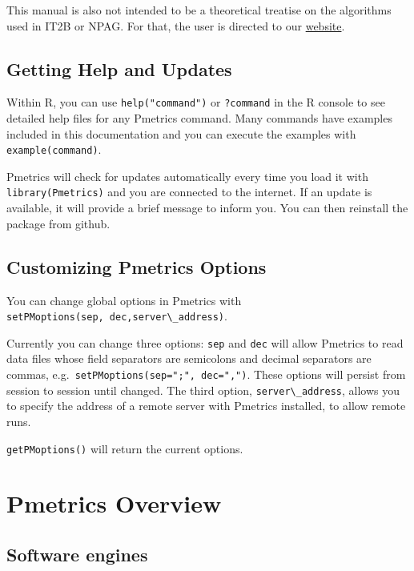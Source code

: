 \documentclass[
]{book}
\begin{document}
This manual is also not intended to be a theoretical treatise on the
algorithms used in IT2B or NPAG. For that, the user is directed to our
\href{http://www.lapk.org}{website}.

\hypertarget{getting-help-and-updates}{%
\section{Getting Help and Updates}\label{getting-help-and-updates}}

Within R, you can use
\texttt{help("command")} or \texttt{?command} in the R console to see detailed help files
for any Pmetrics command. Many commands have examples included in this
documentation and you can execute the examples with \texttt{example(command)}.

Pmetrics will check for updates automatically every time you load it
with \texttt{library(Pmetrics)} and you are connected to the internet.
If an update is available, it will provide a
brief message to inform you. You can then reinstall the package from github.

\hypertarget{customizing-pmetrics-options}{%
\section{Customizing Pmetrics Options}\label{customizing-pmetrics-options}}

You can change global options in Pmetrics with
\texttt{setPMoptions(sep,\ dec,server\textbackslash{}\_address)}.

Currently you can change three options: \texttt{sep} and \texttt{dec} will allow Pmetrics
to read data files whose field separators are semicolons and decimal
separators are commas, e.g.~\texttt{setPMoptions(sep=";",\ dec=",")}. These
options will persist from session to session until changed. The third
option, \texttt{server\textbackslash{}\_address}, allows you to specify the address of a remote
server with Pmetrics installed, to allow remote runs.

\texttt{getPMoptions()} will return the current options.

\hypertarget{pmetrics-overview}{%
\chapter{Pmetrics Overview}\label{pmetrics-overview}}

\hypertarget{software-engines}{%
\section{Software engines}\label{software-engines}}
\end{document}
